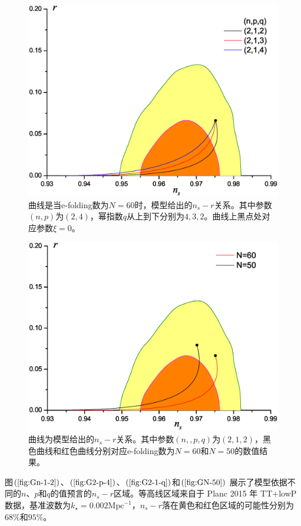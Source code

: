 \begin{figure}\small
  \centering
  \includegraphics[width=5in]{Img/G2,1,q.eps}
  \caption{曲线是当e-folding数为$N=60$时，模型给出的$n_{s}-r$关系。其中参数$(n,
p)$为$(2,4)$，幂指数$q$从上到下分别为$4,3,2$。曲线上黑点处对应参数$\xi=0$。}\label{fig:G2-1-q}
\end{figure}

\begin{figure}\small
  \centering
  \includegraphics[width=5in]{Img/GN=50.eps}
  \caption{曲线为模型给出的$n_{s}-r$关系。其中参数$(n,
,p,q)$为$(2,1,2)$，黑色曲线和红色曲线分别对应e-folding数为$N=60$和$N=50$的数值结果。}\label{fig:GN-50}
\end{figure}

图$(\ref{fig:Gn-1-2})$、$(\ref{fig:G2-p-4})$、$(\ref{fig:G2-1-q})$和$(\ref{fig:GN-50})$
展示了模型依据不同的$n$、$p$和$q$的值预言的$n_{s}-r$区域。等高线区域来自于
Planc 2015 年 TT+lowP
数据，基准波数为$k_{\star}=0.002\text{Mpc}^{-1}$，$n_{s}-r$落在黄色和红色区域的可能性分别为$68\%$和$95\%$。

